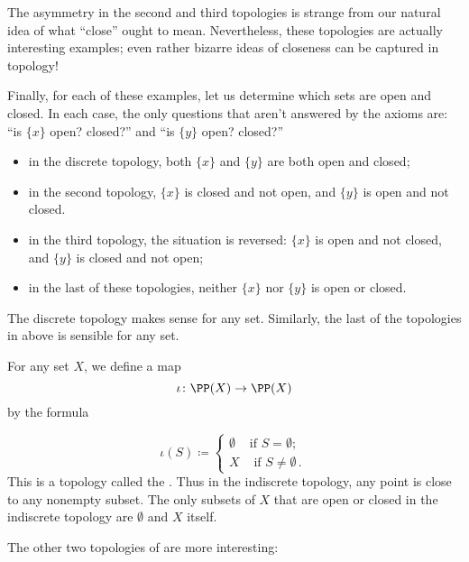 \begin{exm}
	The asymmetry in the second and third topologies is strange from our natural idea of what \enquote{close} ought to mean.
Nevertheless, these topologies are actually interesting examples;
even rather bizarre ideas of closeness can be captured in topology!

	Finally, for each of these examples, let us determine which sets are open and closed.
	In each case, the only questions that aren't answered by the axioms are: \enquote{is $ \{ x \} $ open? closed?} and \enquote{is $ \{ y \} $ open? closed?}
	\begin{itemize}
		\item in the discrete topology, both $ \{ x \} $ and $ \{ y \} $ are both open and closed;
		\item in the second topology, $ \{ x \} $ is closed and not open, and $ \{ y \} $ is open and not closed.
		\item in the third topology, the situation is reversed: $ \{ x \} $ is open and not closed, and $ \{ y \} $ is closed and not open;
		\item in the last of these topologies, neither $ \{ x \} $ nor $ \{ y \} $ is open or closed.
	\end{itemize}
\end{exm}

The discrete topology makes sense for any set.
Similarly, the last of the topologies in  above is sensible for any set.

\begin{exm}
	For any set $ X $, we define a map
	\[
		\iota \colon \PP(X) \to \PP(X)
	\]
	by the formula

	\[
		\iota( S ) \coloneq
		\begin{cases}
			\emptyset & \text{if } S = \emptyset \semicolon \\
			X & \text{ if } S \neq \emptyset \period
		\end{cases}
	\]
	This is a topology called the .
	Thus in the indiscrete topology, any point is close to any nonempty subset.
	The only subsets of $ X $ that are open or closed in the indiscrete topology are $ \emptyset $ and $ X $ itself.
\end{exm}

The other two topologies of  are more interesting:

